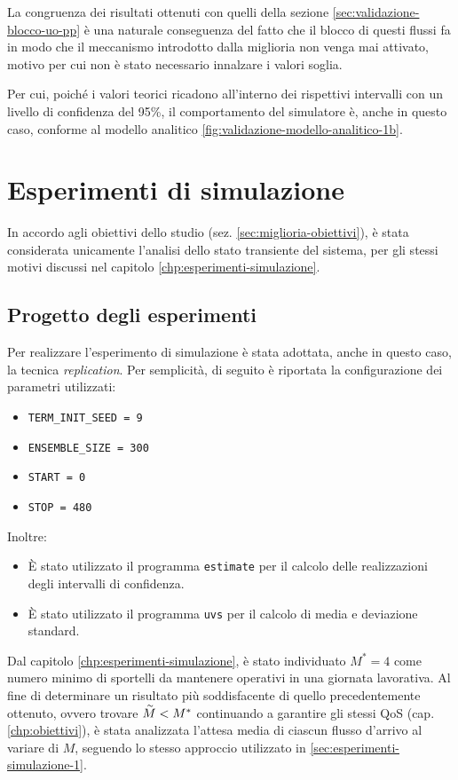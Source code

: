 La congruenza dei risultati ottenuti con quelli della sezione \ref{sec:validazione-blocco-uo-pp} è una naturale conseguenza del fatto che il blocco di questi flussi fa in modo che il meccanismo introdotto dalla miglioria non venga mai attivato, motivo per cui non è stato necessario innalzare i valori soglia.

Per cui, poiché i valori teorici ricadono all'interno dei rispettivi intervalli con un livello di confidenza del 95\%, il comportamento del simulatore è, anche in questo caso, conforme al modello analitico \ref{fig:validazione-modello-analitico-1b}.

\section{Esperimenti di simulazione}\label{sec:miglioria-esperimenti}
In accordo agli obiettivi dello studio (sez. \ref{sec:miglioria-obiettivi}), è stata considerata unicamente l'analisi dello stato transiente del sistema, per gli stessi motivi discussi nel capitolo \ref{chp:esperimenti-simulazione}.

\subsection{Progetto degli esperimenti}
Per realizzare l'esperimento di simulazione è stata adottata, anche in questo caso, la tecnica \textit{replication}. Per semplicità, di seguito è riportata la configurazione dei parametri utilizzati:
\begin{itemize}
\item \texttt{TERM\_INIT\_SEED = 9}
\item \texttt{ENSEMBLE\_SIZE = 300}
\item \texttt{START = 0}
\item \texttt{STOP = 480}
\end{itemize}

Inoltre:
\begin{itemize}
\item È stato utilizzato il programma \texttt{estimate} per il calcolo delle realizzazioni degli intervalli di confidenza.
\item È stato utilizzato il programma \texttt{uvs} per il calcolo di media e deviazione standard.
\end{itemize}

Dal capitolo \ref{chp:esperimenti-simulazione}, è stato individuato $M^* = 4$ come numero minimo di sportelli da mantenere operativi in una giornata lavorativa. Al fine di determinare un risultato più soddisfacente di quello precedentemente ottenuto, ovvero trovare $\accentset{\sim}{M} < M^*$ continuando a garantire gli stessi QoS (cap. \ref{chp:obiettivi}), è stata analizzata l'attesa media di ciascun flusso d'arrivo al variare di $M$, seguendo lo stesso approccio utilizzato in \ref{sec:esperimenti-simulazione-1}.

